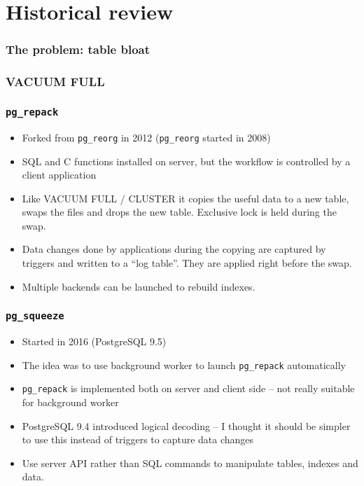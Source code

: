 \section{Historical review}

\begin{frame}
	\frametitle{The problem: table bloat}
\end{frame}

\begin{frame}
	\frametitle{VACUUM FULL}
\end{frame}

\begin{frame}
	\frametitle{\texttt{pg\_repack}}
  \begin{itemize}
    \item Forked from \texttt{pg\_reorg} in 2012 (\texttt{pg\_reorg} started
      in 2008)
    \item SQL and C functions installed on server, but the workflow is
      controlled by a client application
    \item Like VACUUM FULL / CLUSTER it copies the useful data to a new table,
      swaps the files and drops the new table. Exclusive lock is held during
      the swap.
    \item Data changes done by applications during the copying are captured by
      triggers and written to a ``log table''. They are applied right before
      the swap.
    \item Multiple backends can be launched to rebuild indexes.
  \end{itemize}
\end{frame}

\begin{frame}
        \frametitle{\texttt{pg\_squeeze}}
  \begin{itemize}
    \item Started in 2016 (PostgreSQL 9.5)
    \item The idea was to use background worker to launch \texttt{pg\_repack} automatically
    \item \texttt{pg\_repack} is implemented both on server and client side --
      not really suitable for background worker
    \item PostgreSQL 9.4 introduced logical decoding -- I thought it should be
      simpler to use this instead of triggers to capture data changes
    \item Use server API rather than SQL commands to manipulate tables,
      indexes and data.
  \end{itemize}
\end{frame}

